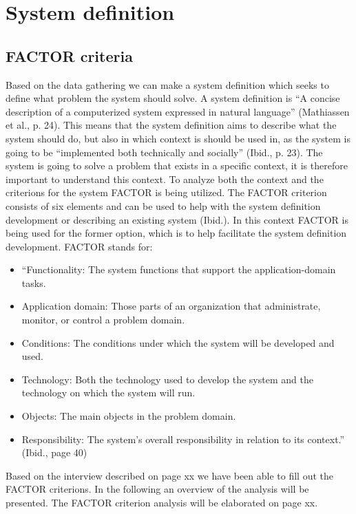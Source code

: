 \section{System definition}
\subsection{FACTOR criteria}

Based on the data gathering we can make a system definition which seeks to define what problem the system should solve. A system definition is “A concise description of a computerized system expressed in natural language” (Mathiassen et al., p. 24). This means that the system definition aims to describe what the system should do, but also in which context is should be used in, as the system is going to be “implemented both technically and socially” (Ibid., p. 23). The system is going to solve a problem that exists in a specific context, it is therefore important to understand this context.
To analyze both the context and the criterions for the system FACTOR is being utilized. The FACTOR criterion consists of six elements and can be used to help with the system definition development or describing an existing system (Ibid.). In this context FACTOR is being used for the former option, which is to help facilitate the system definition development. FACTOR stands for:

\begin{itemize}
\item “Functionality: The system functions that support the application-domain tasks.

\item Application domain: Those parts of an organization that administrate, monitor, or control a problem domain.

\item Conditions: The conditions under which the system will be developed and used.

\item Technology: Both the technology used to develop the system and the technology on which the system will run.

\item Objects: The main objects in the problem domain.

\item Responsibility: The system’s overall responsibility in relation to its context.” (Ibid., page 40)
\end{itemize}

Based on the interview described on page xx we have been able to fill out the FACTOR criterions. In the following an overview of the analysis will be presented. The FACTOR criterion analysis will be elaborated on page xx.

